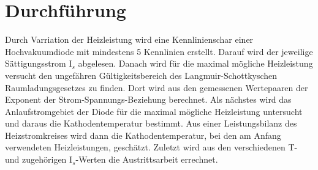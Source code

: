 \section{Durchführung}
\label{sec:Durchführung}
Durch Varriation der Heizleistung wird eine Kennlinienschar einer Hochvakuumdiode mit mindestens 5 Kennlinien erstellt.
Darauf wird der jeweilige Sättigungsstrom $\text{I}_s$ abgelesen.
Danach wird für die maximal mögliche Heizleistung versucht den ungefähren Gültigkeitsbereich des Langmuir-Schottkyschen Raumladungsgesetzes zu finden.
Dort wird aus den gemessenen Wertepaaren der Exponent der Strom-Spannungs-Beziehung berechnet.
Als nächstes wird das Anlaufstromgebiet der Diode für die maximal mögliche Heizleistung untersucht und daraus die Kathodentemperatur bestimmt.
Aus einer Leistungsbilanz des Heizstromkreises wird dann die Kathodentemperatur, bei den am Anfang verwendeten Heizleistungen, geschätzt.
Zuletzt wird aus den verschiedenen T- und zugehörigen $\text{I}_s$-Werten die Austrittsarbeit errechnet.